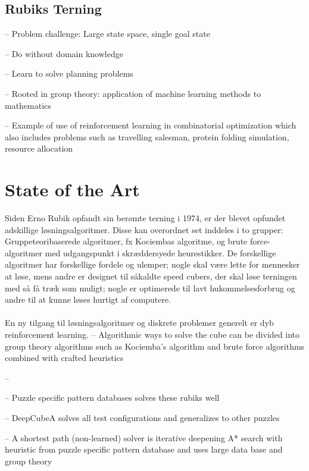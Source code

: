 \documentclass[../main.tex]{subfiles}
\begin{document}
\subsection{Rubiks Terning}

\cite{SolvingNature}



-- Problem challenge: Large state space, single goal state 

-- Do without domain knowledge

-- Learn to solve planning problems

-- Rooted in group theory: application of machine learning methods to mathematics

\cite{RubiksMedium}
-- Example of use of reinforcement learning in combinatorial optimization which also includes problems such as travelling salesman, protein folding simulation, resource allocation

\section{State of the Art}
\cite{RubiksMedium}
Siden Erno Rubik opfandt sin berømte terning i 1974, er der blevet opfundet adskillige løsningsalgoritmer.
Disse kan overordnet set inddeles i to grupper:
Gruppeteoribaserede algoritmer, fx Kociembas algoritme, og brute force-algoritmer med udgangspunkt i skræddersyede heurestikker.
De forskellige algoritmer har forskellige fordele og ulemper;
nogle skal være lette for mennesker at løse, mens andre er designet til såkaldte speed cubers, der skal løse terningen med så få træk som muligt;
nogle er optimerede til lavt hukommelsesforbrug og andre til at kunne løses hurtigt af computere.\\
\\
En ny tilgang til løsningsalgoritmer og diskrete problemer generelt er dyb reinforcement learning.
-- Algorithmic ways to solve the cube can be divided into group theory algorithms such as Kociemba's algorithm and brute force algorithms combined with crafted heuristics

--



\cite{SolvingNature}
-- Puzzle specific pattern databases solves these rubiks well


-- DeepCubeA solves all test configurations and generalizes to other puzzles

-- A shortest path (non-learned) solver is iterative deepening A* search with heuristic from puzzle specific pattern database and uses large data base and group theory 
\end{document}
